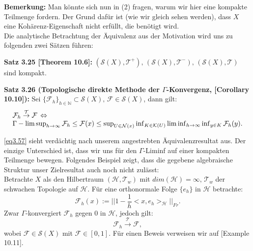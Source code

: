 \textbf{Bemerkung:} Man könnte sich nun in (2) fragen, warum wir hier eine kompakte Teilmenge fordern. Der Grund dafür ist (wie wir gleich sehen werden), dass \(X\) eine Kohärenz-Eigenschaft nicht erfüllt, die benötigt wird.\\

Die analytische Betrachtung der Äquivalenz aus der Motivation wird uns zu folgenden zwei Sätzen führen:\\[0.5cm]
\colorbox{generalYellow}{\begin{minipage}{16cm}{\textcolor{black}{}{\label{theo3.25}}}
\textbf{Satz 3.25 \cite{MasoGamma}[Theorem 10.6]:} \((\mathcal{S}(X),\mathcal{T}^+), \, (\mathcal{S}(X),\mathcal{T}^-), \, (\mathcal{S}(X),\mathcal{T})\) sind kompakt.
\end{minipage}}
\newpage
{}\colorbox{generalYellow}{\begin{minipage}{16cm}{\textcolor{black}{}{\label{theo3.26}}}
\textbf{Satz 3.26 (Topologische direkte Methode der \(\Gamma\)-Konvergenz, \cite{MasoGamma}[Corollary 10.10]):} Sei \(\{\mathcal{F}_h\}_{h \in \mathbb{N}} \subset \mathcal{S}(X), \, \mathcal{F} \in \mathcal{S}(X)\), dann gilt:
\begin{equation}{\label{eq3.57}}
\begin{array}{l}
    \mathcal{F}_h \stackrel{\mathcal{T}}{\to} \mathcal{F} \, \Leftrightarrow \\
    \Gamma-\limsup_{h \to \infty} \mathcal{F}_h \leq \mathcal{F}(x) \leq \sup_{U \in \mathcal{N}(x)} \inf_{K \in \mathcal{K}(U)} \liminf_{h \to \infty} \inf_{y \in K} \mathcal{F}_h(y).
\end{array}
\end{equation}
\end{minipage}}

\eqref{eq3.57} sieht verdächtig nach unserem angestrebten Äquivalenzresultat aus. Der einzige Unterschied ist, dass wir uns für den \(\Gamma\)-Liminf auf einer kompakten Teilmenge bewegen. Folgendes Beispiel zeigt, dass die gegebene algebraische Struktur unser Zielresultat auch noch nicht zulässt:\\
Betrachte \(X\) als den Hilbertraum \((\mathcal{H},\mathcal{T}_w)\) mit \(dim(\mathcal{H}) = \infty, \, \mathcal{T}_w\) der schwachen Topologie auf \(\mathcal{H}\). Für eine orthonormale Folge \(\{e_h\}\) in \(\mathcal{H}\) betrachte:
\begin{equation}
    \mathcal{F}_h(x) := ||1 - \frac{1}{h} <x,e_h>_{\mathcal{H}}||_{Fr}.
\end{equation}
Zwar \(\Gamma\)-konvergiert \(\mathcal{F}_h\) gegen 0 in \(\mathcal{H}\), jedoch gilt:
\begin{equation}
    \mathcal{F}_h \stackrel{\mathcal{T}}{\to} \mathcal{F},
\end{equation}
wobei \(\mathcal{F} \in \mathcal{S}(X)\) mit \(\mathcal{F} \in [0,1]\). Für einen Beweis verweisen wir auf \cite{MasoGamma}[Example 10.11].\\

